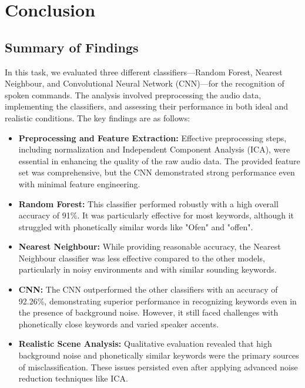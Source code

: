 \section{Conclusion}

\subsection{Summary of Findings}
In this task, we evaluated three different classifiers—Random Forest, Nearest Neighbour, and Convolutional Neural Network (CNN)—for the recognition of spoken commands. The analysis involved preprocessing the audio data, implementing the classifiers, and assessing their performance in both ideal and realistic conditions. The key findings are as follows:

\begin{itemize}
    \item \textbf{Preprocessing and Feature Extraction:} Effective preprocessing steps, including normalization and Independent Component Analysis (ICA), were essential in enhancing the quality of the raw audio data. The provided feature set was comprehensive, but the CNN demonstrated strong performance even with minimal feature engineering.

    \item \textbf{Random Forest:} This classifier performed robustly with a high overall accuracy of 91\%. It was particularly effective for most keywords, although it struggled with phonetically similar words like "Ofen" and "offen".

    \item \textbf{Nearest Neighbour:} While providing reasonable accuracy, the Nearest Neighbour classifier was less effective compared to the other models, particularly in noisy environments and with similar sounding keywords.

    \item \textbf{CNN:} The CNN outperformed the other classifiers with an accuracy of 92.26\%, demonstrating superior performance in recognizing keywords even in the presence of background noise. However, it still faced challenges with phonetically close keywords and varied speaker accents.

    \item \textbf{Realistic Scene Analysis:} Qualitative evaluation revealed that high background noise and phonetically similar keywords were the primary sources of misclassification. These issues persisted even after applying advanced noise reduction techniques like ICA.
\end{itemize}

